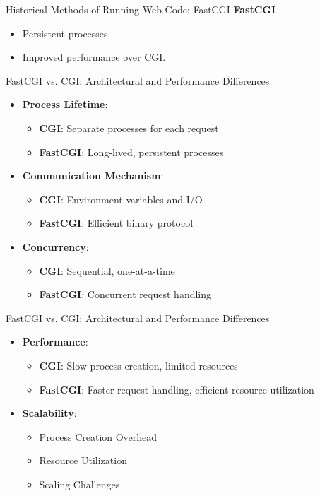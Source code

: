 \documentclass{beamer}
\begin{document}
\begin{frame}{Historical Methods of Running Web Code: FastCGI}
	\textbf{FastCGI}
	\begin{itemize}[<+->]
		\item Persistent processes.
		\item Improved performance over CGI.
	\end{itemize}
\end{frame}
\begin{frame}{FastCGI vs. CGI: Architectural and Performance Differences}
	\begin{itemize}[<+->]
		\item \textbf{Process Lifetime}:
		\begin{itemize}
			\item \textbf{CGI}: Separate processes for each request
			\item \textbf{FastCGI}: Long-lived, persistent processes
		\end{itemize}
		\item \textbf{Communication Mechanism}:
		\begin{itemize}
			\item \textbf{CGI}: Environment variables and I/O
			\item \textbf{FastCGI}: Efficient binary protocol
		\end{itemize}
		\item \textbf{Concurrency}:
		\begin{itemize}
			\item \textbf{CGI}: Sequential, one-at-a-time
			\item \textbf{FastCGI}: Concurrent request handling
		\end{itemize}
	\end{itemize}
\end{frame}


\begin{frame}{FastCGI vs. CGI: Architectural and Performance Differences}
	\begin{itemize}[<+->]
		\item \textbf{Performance}:
		\begin{itemize}
			\item \textbf{CGI}: Slow process creation, limited resources
			\item \textbf{FastCGI}: Faster request handling, efficient resource utilization
		\end{itemize}
		\item \textbf{Scalability}:
		\begin{itemize}
		\item Process Creation Overhead
		\item Resource Utilization
		\item Scaling Challenges
		\end{itemize}
	\end{itemize}
\end{frame}
\end{document}
